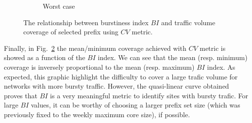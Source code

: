 \begin{figure}[!tb]
\begin{subfigure}[b]{0.53\textwidth}
                \caption{Worst case}
                \label{fig:bi_cvg_worst}
        \end{subfigure}
\caption{The relationship between burstiness index $BI$ and traffic volume coverage of selected prefix using $CV$ metric.}
\label{fig:bi_cvg}
\end{figure}

Finally, in Fig.~\ref{fig:bi_cvg} the mean/minimum coverage achieved with $CV$ metric is showed as a function of the $BI$ index. We can see that the mean (resp. minimum) coverage is inversely proportional to the mean (resp. maximum) $BI$ index. As expected, this graphic highlight the difficulty to cover a large trafic volume for networks with more bursty traffic. However, the quasi-linear curve obtained proves that $BI$ is a very meaningful metric to identify sites with bursty trafic. For large $BI$ values, it can be worthy of choosing a larger prefix set size (which was previously fixed to the weekly maximum core size), if possible. 
